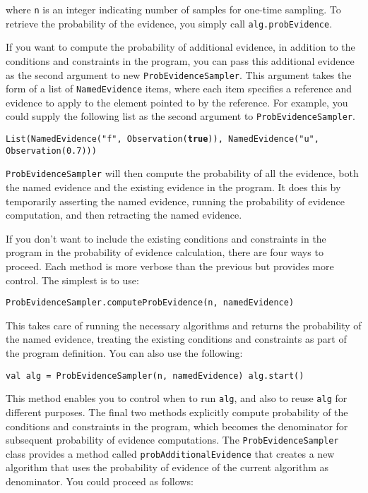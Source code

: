 where \texttt{n} is an integer indicating number of samples for one-time sampling. To retrieve the probability of the evidence, you simply call \texttt{alg.probEvidence}.

If you want to compute the probability of additional evidence, in addition to the conditions and constraints in the program, you can pass this additional evidence as the second argument to new \texttt{ProbEvid\-enceSampler}. This argument takes the form of a list of \texttt{NamedEvidence} items, where each item specifies a reference and evidence to apply to the element pointed to by the reference. For example, you could supply the following list as the second argument to \texttt{ProbEvidenceSampler}.

\begin{flushleft}
\texttt{List(NamedEvidence("f", Observation(\textbf{true})), 
\newline NamedEvidence("u", Observation(0.7))) }
\end{flushleft}

\texttt{ProbEvidenceSampler} will then compute the probability of all the evidence, both the named evidence and the existing evidence in the program. It does this by temporarily asserting the named evidence, running the probability of evidence computation, and then retracting the named evidence.

If you don't want to include the existing conditions and constraints in the program in the probability of evidence calculation, there are four ways to proceed. Each method is more verbose than the previous but provides more control. The simplest is to use:

\begin{flushleft}
\texttt{ProbEvidenceSampler.computeProbEvidence(n, namedEvidence)}
\end{flushleft}

This takes care of running the necessary algorithms and returns the probability of the named evidence, treating the existing conditions and constraints as part of the program definition. You can also use the following:

\begin{flushleft}
\texttt{val alg = ProbEvidenceSampler(n, namedEvidence)
\newline alg.start()
}
\end{flushleft}

This method enables you to control when to run \texttt{alg}, and also to reuse \texttt{alg} for different purposes. The final two methods explicitly compute probability of the conditions and constraints in the program, which becomes the denominator for subsequent probability of evidence computations. The \texttt{ProbEvidenceSampler} class provides a method called \texttt{probAdditionalEvidence} that creates a new algorithm that uses the probability of evidence of the current algorithm as denominator. You could proceed as follows:

